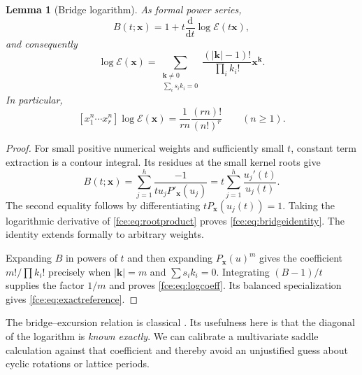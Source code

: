 \documentclass[11pt,a4paper]{article}
\numberwithin{equation}{section}
\newtheorem{lemma}[theorem]{Lemma}
\theoremstyle{definition}\newtheorem{definition}[theorem]{Definition}
\theoremstyle{remark}\newtheorem{remark}[theorem]{Remark}
\newcommand{\E}{\mathcal E}
\begin{document}
\begin{lemma}[Bridge logarithm]\label{fce:lem:bridge}
As formal power series,
\begin{equation}\label{fce:eq:bridgeidentity}
 B(t;\boldsymbol x)=1+t\frac{\mathrm d}{\mathrm dt}
             \log\E(t\boldsymbol x),
\end{equation}
and consequently
\begin{equation}\label{fce:eq:logcoeff}
 \log\E(\boldsymbol x)=
 \sum_{\substack{\boldsymbol k\ne0\\\sum_i s_i k_i=0}}
 \frac{(|\boldsymbol k|-1)!}{\prod_i k_i!}
 \boldsymbol x^{\boldsymbol k}.
\end{equation}
In particular,
\begin{equation}\label{fce:eq:exactreference}
 [x_1^n\cdots x_r^n]\log\E(\boldsymbol x)
 =\frac{1}{rn}\frac{(rn)!}{(n!)^r}\qquad(n\ge1).
\end{equation}
\end{lemma}
\begin{proof}
For small positive numerical weights and sufficiently small $t$, constant
term extraction is a contour integral. Its residues at the small kernel
roots give
\[
 B(t;\boldsymbol x)
 =\sum_{j=1}^h\frac{-1}{t u_jP'_{\boldsymbol x}(u_j)}
 =t\sum_{j=1}^h\frac{u_j'(t)}{u_j(t)}.
\]
The second equality follows by differentiating
$tP_{\boldsymbol x}(u_j(t))=1$. Taking the logarithmic derivative of
\eqref{fce:eq:rootproduct} proves \eqref{fce:eq:bridgeidentity}. The identity
extends formally to arbitrary weights.

Expanding $B$ in powers of $t$ and then expanding
$P_{\boldsymbol x}(u)^m$ gives the coefficient
$m!/\prod k_i!$ precisely when $|\boldsymbol k|=m$ and
$\sum s_i k_i=0$. Integrating $(B-1)/t$ supplies the factor $1/m$ and
proves \eqref{fce:eq:logcoeff}. Its balanced specialization gives
\eqref{fce:eq:exactreference}.
\end{proof}
The bridge--excursion relation is classical \cite{bf}. Its usefulness here
is that the diagonal of the logarithm is \emph{known exactly}. We can
calibrate a multivariate saddle calculation against that coefficient and
thereby avoid an unjustified guess about cyclic rotations or lattice
periods.
\end{document}
